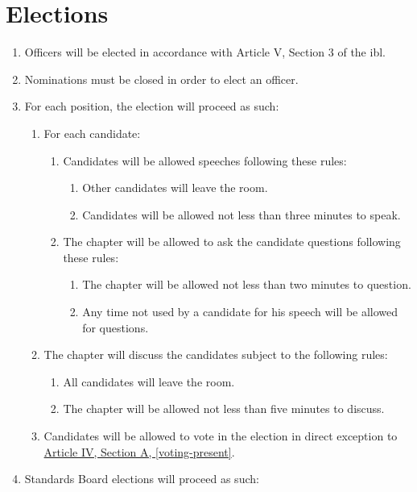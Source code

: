 \section{Elections}
	\label{elections}
	\begin{enumerate}
		\item Officers will be elected in accordance with Article V, Section 3 of the \gls{ibl}.
		\item Nominations must be closed in order to elect an officer.
		\item For each position, the election will proceed as such:
			\begin{enumerate}
				\item For each candidate:
					\begin{enumerate}
						\item Candidates will be allowed speeches following
						these rules:
							\begin{enumerate}
								\item Other candidates will leave the room.
								\item Candidates will be allowed not less than
								three minutes to speak.
							\end{enumerate}
						\item The chapter will be allowed to ask the
						candidate questions following these rules:
							\begin{enumerate}
								\item The chapter will be allowed not less
								than two minutes to question.
								\item Any time not used by a candidate for his
								speech will be allowed for questions.
							\end{enumerate}
					\end{enumerate}
				\item The chapter will discuss the candidates subject to the
				following rules:
					\begin{enumerate}
						\item All candidates will leave the room.
						\item The chapter will be allowed not less than five
						minutes to discuss.
					\end{enumerate}
				\item Candidates will be allowed to vote in the election in direct exception to \hyperref[voting-present]{Article IV, Section A, \autoref*{voting-present}}. 
			\end{enumerate}
    \item Standards Board elections will proceed as such:

\end{enumerate}
